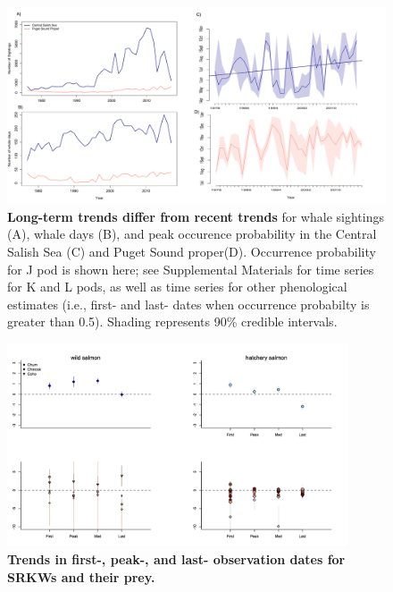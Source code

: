 \documentclass{article}
\begin{document}
\begin{figure}[p]
\includegraphics{../analyses/figures/OrcaPhenPlots/timeseries_1976_assumeSRKW2regs.pdf} 
\caption{\textbf{Long-term trends differ from recent trends} for whale sightings (A), whale days (B), and peak occurence probability in the Central Salish Sea (C) and Puget Sound proper(D). Occurrence probability for J pod is shown here; see Supplemental Materials for time series for K and L pods, as well as time series for other phenological estimates (i.e., first- and last- dates when occurrence probabilty is greater than 0.5). Shading represents 90\% credible intervals.}
 \label{fig:timeseries}
 \end{figure}
 

\begin{figure}[p]
\includegraphics[width=0.9\textwidth]{../analyses/figures/srkw_salmon_shifts_lm.png} 
\caption{\textbf{Trends in first-, peak-, and last- observation dates for SRKWs and their prey.}}
 \label{fig:shifts}
 \end{figure}
\end{document}
